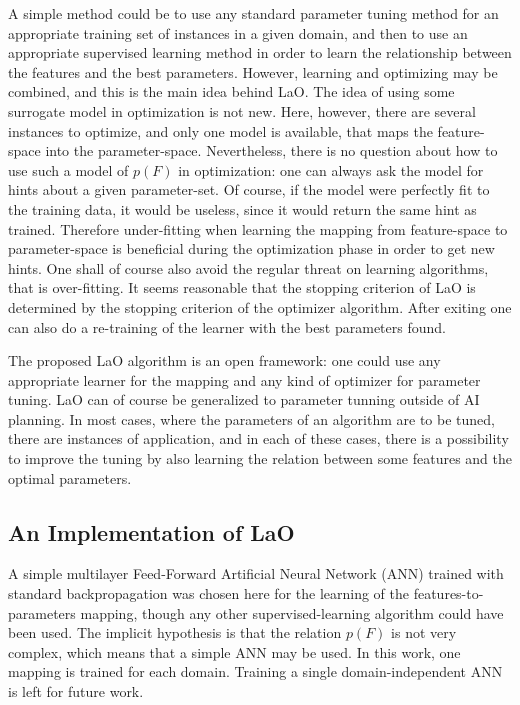 \documentclass[letterpaper]{article}
\begin{document}
A simple method could be to use any standard parameter tuning method for an appropriate training set of instances in a given domain, and then to use an appropriate supervised learning method in order to learn the relationship between the features and the best parameters. However, learning and optimizing may be combined, and this is the main idea behind LaO. The idea of using some surrogate model in optimization is not new. Here, however, there are  several instances to optimize, and only one model is available, that maps the feature-space into the parameter-space. Nevertheless, there is no question about how to use such a model of \begin{math}p(F)\end{math} in optimization: one can always ask the model for hints about a given parameter-set. Of course, if the model were perfectly fit to the training data, it would be useless, since it would return the same hint as trained. Therefore under-fitting when learning the mapping from feature-space to parameter-space is beneficial during the optimization phase in order to get new hints. One shall of course also avoid the regular threat on learning algorithms, that is over-fitting. It seems reasonable that the stopping criterion of LaO is determined by the stopping criterion of the optimizer algorithm. After exiting one can also do a re-training of the learner with the best parameters found.

The proposed LaO algorithm is an open framework: one could use any appropriate learner for the mapping and any kind of optimizer for parameter tuning. LaO can of course be generalized to parameter tunning outside of AI planning. In most cases, where the parameters of an algorithm are to be tuned, there are instances of application, and in each of these cases, there is a possibility to improve the tuning by also learning the relation between some features and the optimal parameters.

\subsection{An Implementation of LaO}

A simple multilayer Feed-Forward Artificial Neural Network (ANN) trained with standard backpropagation was chosen here for the learning of the features-to-parameters mapping, though any other supervised-learning algorithm could have been used. The implicit hypothesis is that the relation \begin{math}p(F)\end{math} is not very complex, which means that a simple ANN may be used. In this work, one mapping is trained for each domain. Training a single domain-independent ANN is left for future work.
\end{document}
